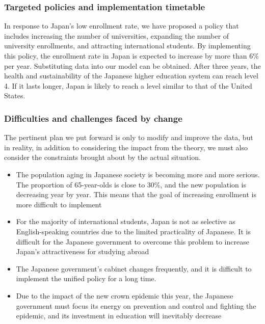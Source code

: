 \documentclass[12pt]{article}  %
\begin{document}
\subsubsection{Targeted policies and implementation timetable}

In response to Japan’s low enrollment rate, we have proposed a policy that includes increasing the number of universities, expanding the number of university enrollments, and attracting international students. By implementing this policy, the enrollment rate in Japan is expected to increase by more than 6\% per year. Substituting data into our model can be obtained. After three years, the health and sustainability of the Japanese higher education system can reach level 4. If it lasts longer, Japan is likely to reach a level similar to that of the United States.

\subsubsection{ Difficulties and challenges faced by change}

The pertinent plan we put forward is only to modify and improve the data, but in reality, in addition to considering the impact from the theory, we must also consider the constraints brought about by the actual situation.

\begin{itemize}
\item The population aging in Japanese society is becoming more and more serious. The proportion of 65-year-olds is close to 30\%, and the new population is decreasing year by year. This means that the goal of increasing enrollment is more difficult to implement

\item For the majority of international students, Japan is not as selective as English-speaking countries due to the limited practicality of Japanese. It is difficult for the Japanese government to overcome this problem to increase Japan’s attractiveness for studying abroad

\item The Japanese government's cabinet changes frequently, and it is difficult to implement the unified policy for a long time.

\item Due to the impact of the new crown epidemic this year, the Japanese government must focus its energy on prevention and control and fighting the epidemic, and its investment in education will inevitably decrease


\end{itemize}
\end{document}
